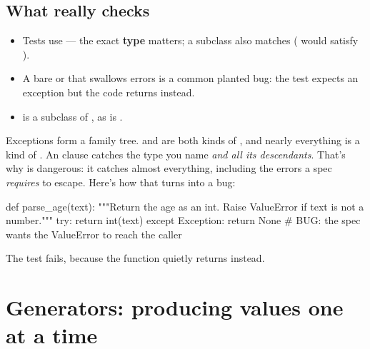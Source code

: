 \documentclass[10pt,a4paper]{article}
\begin{document}
\subsection{What  really checks}
\begin{itemize}
\item Tests use  — the exact \textbf{type} matters; a subclass also matches ( would satisfy ).
\item A bare  or  that swallows errors is a common planted bug: the test expects an exception but the code returns  instead.
\item {} is a subclass of , as is .
\end{itemize}
Exceptions form a family tree.  and  are both kinds of , and nearly everything is a kind of . An  clause catches the type you name \emph{and all its descendants}. That’s why  is dangerous: it catches almost everything, including the errors a spec \emph{requires} to escape. Here’s how that turns into a bug:
\begin{pycode}
def parse_age(text):
    """Return the age as an int. Raise ValueError if text is not a number."""
    try:
        return int(text)
    except Exception:
        return None          # BUG: the spec wants the ValueError to reach the caller
\end{pycode}
The test  fails, because the function quietly returns  instead.
\setcounter{section}{7}
\section{Generators: producing values one at a time}
\end{document}
